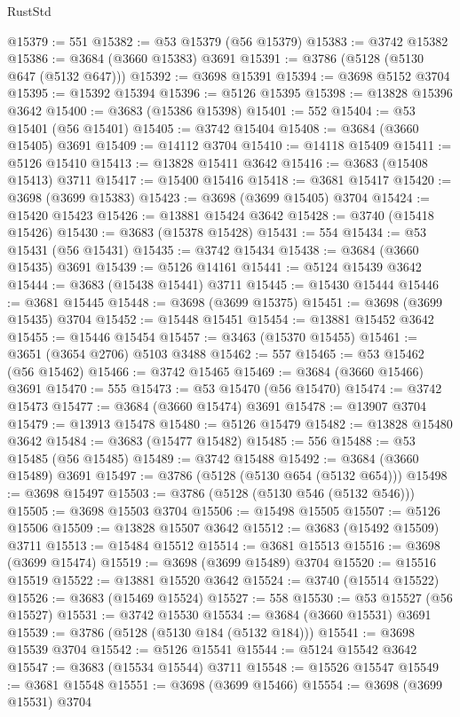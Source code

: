 \begin{lexlean}{RustStd}
\begin{coremodule}
@15379 := 551
@15382 := @53 @15379 (@56 @15379)
@15383 := @3742 @15382
@15386 := @3684 (@3660 @15383) @3691
@15391 := @3786 (@5128 (@5130 @647 (@5132 @647)))
@15392 := @3698 @15391
@15394 := @3698 @5152 @3704
@15395 := @15392 @15394
@15396 := @5126 @15395
@15398 := @13828 @15396 @3642
@15400 := @3683 (@15386 @15398)
@15401 := 552
@15404 := @53 @15401 (@56 @15401)
@15405 := @3742 @15404
@15408 := @3684 (@3660 @15405) @3691
@15409 := @14112 @3704
@15410 := @14118 @15409
@15411 := @5126 @15410
@15413 := @13828 @15411 @3642
@15416 := @3683 (@15408 @15413) @3711
@15417 := @15400 @15416
@15418 := @3681 @15417
@15420 := @3698 (@3699 @15383)
@15423 := @3698 (@3699 @15405) @3704
@15424 := @15420 @15423
@15426 := @13881 @15424 @3642
@15428 := @3740 (@15418 @15426)
@15430 := @3683 (@15378 @15428)
@15431 := 554
@15434 := @53 @15431 (@56 @15431)
@15435 := @3742 @15434
@15438 := @3684 (@3660 @15435) @3691
@15439 := @5126 @14161
@15441 := @5124 @15439 @3642
@15444 := @3683 (@15438 @15441) @3711
@15445 := @15430 @15444
@15446 := @3681 @15445
@15448 := @3698 (@3699 @15375)
@15451 := @3698 (@3699 @15435) @3704
@15452 := @15448 @15451
@15454 := @13881 @15452 @3642
@15455 := @15446 @15454
@15457 := @3463 (@15370 @15455)
@15461 := @3651 (@3654 @2706) @5103 @3488
@15462 := 557
@15465 := @53 @15462 (@56 @15462)
@15466 := @3742 @15465
@15469 := @3684 (@3660 @15466) @3691
@15470 := 555
@15473 := @53 @15470 (@56 @15470)
@15474 := @3742 @15473
@15477 := @3684 (@3660 @15474) @3691
@15478 := @13907 @3704
@15479 := @13913 @15478
@15480 := @5126 @15479
@15482 := @13828 @15480 @3642
@15484 := @3683 (@15477 @15482)
@15485 := 556
@15488 := @53 @15485 (@56 @15485)
@15489 := @3742 @15488
@15492 := @3684 (@3660 @15489) @3691
@15497 := @3786 (@5128 (@5130 @654 (@5132 @654)))
@15498 := @3698 @15497
@15503 := @3786 (@5128 (@5130 @546 (@5132 @546)))
@15505 := @3698 @15503 @3704
@15506 := @15498 @15505
@15507 := @5126 @15506
@15509 := @13828 @15507 @3642
@15512 := @3683 (@15492 @15509) @3711
@15513 := @15484 @15512
@15514 := @3681 @15513
@15516 := @3698 (@3699 @15474)
@15519 := @3698 (@3699 @15489) @3704
@15520 := @15516 @15519
@15522 := @13881 @15520 @3642
@15524 := @3740 (@15514 @15522)
@15526 := @3683 (@15469 @15524)
@15527 := 558
@15530 := @53 @15527 (@56 @15527)
@15531 := @3742 @15530
@15534 := @3684 (@3660 @15531) @3691
@15539 := @3786 (@5128 (@5130 @184 (@5132 @184)))
@15541 := @3698 @15539 @3704
@15542 := @5126 @15541
@15544 := @5124 @15542 @3642
@15547 := @3683 (@15534 @15544) @3711
@15548 := @15526 @15547
@15549 := @3681 @15548
@15551 := @3698 (@3699 @15466)
@15554 := @3698 (@3699 @15531) @3704

\end{coremodule}
\end{lexlean}
